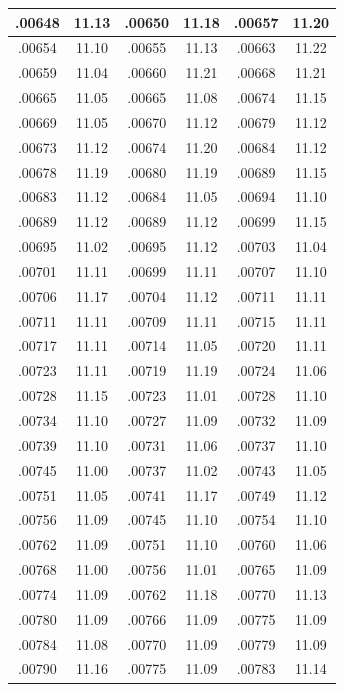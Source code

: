 \documentclass[11pt]{report}
\begin{document}
\begin{appendices}
\begin{longtable}{|c|c||c|c||c|c|}
.00648 & 11.13 & .00650 & 11.18 & .00657 & 11.20\\\hline
.00654 & 11.10 & .00655 & 11.13 & .00663 & 11.22\\\hline
.00659 & 11.04 & .00660 & 11.21 & .00668 & 11.21\\\hline
.00665 & 11.05 & .00665 & 11.08 & .00674 & 11.15\\\hline
.00669 & 11.05 & .00670 & 11.12 & .00679 & 11.12\\\hline
.00673 & 11.12 & .00674 & 11.20 & .00684 & 11.12\\\hline
.00678 & 11.19 & .00680 & 11.19 & .00689 & 11.15\\\hline
.00683 & 11.12 & .00684 & 11.05 & .00694 & 11.10\\\hline
.00689 & 11.12 & .00689 & 11.12 & .00699 & 11.15\\\hline
.00695 & 11.02 & .00695 & 11.12 & .00703 & 11.04\\\hline
.00701 & 11.11 & .00699 & 11.11 & .00707 & 11.10\\\hline
.00706 & 11.17 & .00704 & 11.12 & .00711 & 11.11\\\hline
.00711 & 11.11 & .00709 & 11.11 & .00715 & 11.11\\\hline
.00717 & 11.11 & .00714 & 11.05 & .00720 & 11.11\\\hline
.00723 & 11.11 & .00719 & 11.19 & .00724 & 11.06\\\hline
.00728 & 11.15 & .00723 & 11.01 & .00728 & 11.10\\\hline
.00734 & 11.10 & .00727 & 11.09 & .00732 & 11.09\\\hline
.00739 & 11.10 & .00731 & 11.06 & .00737 & 11.10\\\hline
.00745 & 11.00 & .00737 & 11.02 & .00743 & 11.05\\\hline
.00751 & 11.05 & .00741 & 11.17 & .00749 & 11.12\\\hline
.00756 & 11.09 & .00745 & 11.10 & .00754 & 11.10\\\hline
.00762 & 11.09 & .00751 & 11.10 & .00760 & 11.06\\\hline
.00768 & 11.00 & .00756 & 11.01 & .00765 & 11.09\\\hline
.00774 & 11.09 & .00762 & 11.18 & .00770 & 11.13\\\hline
.00780 & 11.09 & .00766 & 11.09 & .00775 & 11.09\\\hline
.00784 & 11.08 & .00770 & 11.09 & .00779 & 11.09\\\hline
.00790 & 11.16 & .00775 & 11.09 & .00783 & 11.14\\\hline

\end{longtable}
\end{appendices}
\end{document}
